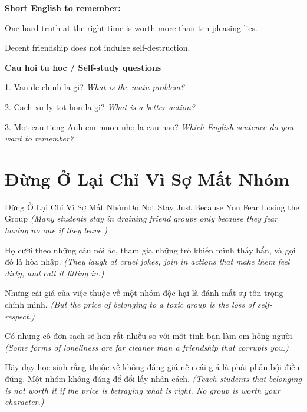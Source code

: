\begin{ghinhoanh}
\textbf{Short English to remember:}

One hard truth at the right time is worth more than ten pleasing lies.

Decent friendship does not indulge self-destruction.

\end{ghinhoanh}

\begin{tuhocnhanh}
\textbf{Cau hoi tu hoc / Self-study questions}

1. Van de chinh la gi? \textit{What is the main problem?}

2. Cach xu ly tot hon la gi? \textit{What is a better action?}

3. Mot cau tieng Anh em muon nho la cau nao? \textit{Which English sentence do you want to remember?}
\end{tuhocnhanh}
\ngancach

\section{Đừng Ở Lại Chỉ Vì Sợ Mất Nhóm}
\begin{truyen}{Đừng Ở Lại Chỉ Vì Sợ Mất Nhóm}{Do Not Stay Just Because You Fear Losing the Group}
\textit{(Many students stay in draining friend groups only because they fear having no one if they leave.)}

Họ cười theo những câu nói ác, tham gia những trò khiến mình thấy bẩn, và gọi đó là hòa nhập.
\textit{(They laugh at cruel jokes, join in actions that make them feel dirty, and call it fitting in.)}

Nhưng cái giá của việc thuộc về một nhóm độc hại là đánh mất sự tôn trọng chính mình.
\textit{(But the price of belonging to a toxic group is the loss of self-respect.)}

Có những cô đơn sạch sẽ hơn rất nhiều so với một tình bạn làm em hỏng người.
\textit{(Some forms of loneliness are far cleaner than a friendship that corrupts you.)}

\end{truyen}

\begin{baihoc}
Hãy dạy học sinh rằng thuộc về không đáng giá nếu cái giá là phải phản bội điều đúng. Một nhóm không đáng để đổi lấy nhân cách.
\textit{(Teach students that belonging is not worth it if the price is betraying what is right. No group is worth your character.)}
\end{baihoc}

